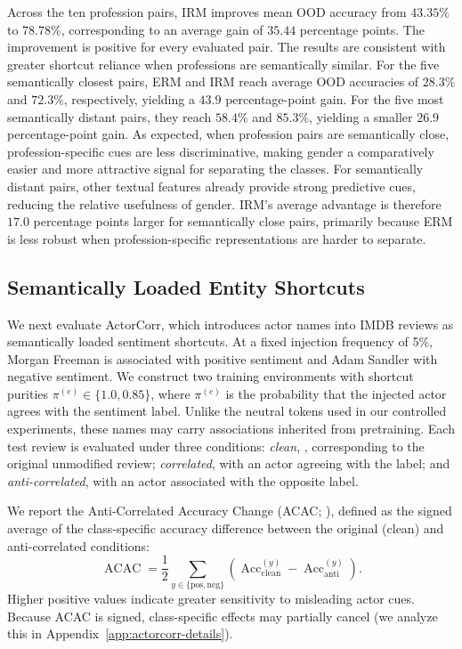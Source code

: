 \documentclass[11pt]{article}
\theoremstyle{definition}
\theoremstyle{plain}
\begin{document}
Across the ten profession pairs, IRM improves mean OOD accuracy from $43.35\%$ to $78.78\%$, corresponding to an average gain of $35.44$ percentage points. The improvement is positive for every evaluated pair. The results are consistent with greater shortcut reliance when professions are semantically similar. For the five semantically closest pairs, ERM and IRM reach average OOD accuracies of $28.3\%$ and $72.3\%$, respectively, yielding a $43.9$ percentage-point gain. For the five most semantically distant pairs, they reach $58.4\%$ and $85.3\%$, yielding a smaller $26.9$ percentage-point gain. As expected, when profession pairs are semantically close, profession-specific cues are less discriminative, making gender a comparatively easier and more attractive signal for separating the classes. For semantically distant pairs, other textual features already provide strong predictive cues, reducing the relative usefulness of gender. IRM's average advantage is therefore $17.0$ percentage points larger for semantically close pairs, primarily because ERM is less robust when profession-specific representations are harder to separate.


\subsection{Semantically Loaded Entity Shortcuts}
\label{sec:actorcorr}

We next evaluate ActorCorr, which introduces actor names into IMDB reviews as semantically loaded sentiment shortcuts. At a fixed injection frequency of 5\%, Morgan Freeman is associated with positive sentiment and Adam Sandler with negative sentiment. We construct two training environments with shortcut purities $\pi^{(e)}\in\{1.0,0.85\}$, where $\pi^{(e)}$ is the probability that the injected actor agrees with the sentiment label. Unlike the neutral tokens used in our controlled experiments, these names may carry associations inherited from pretraining. Each test review is evaluated under three conditions: \emph{clean}, , corresponding to the original unmodified review; \emph{correlated}, with an actor agreeing with the label; and \emph{anti-correlated}, with an actor associated with the opposite label.

We report the Anti-Correlated Accuracy Change (ACAC; \citet{eshuijs2025short}), defined as the signed
average of the class-specific accuracy difference between the original (clean) and anti-correlated conditions:
\begin{equation}
    \operatorname{ACAC} = \frac{1}{2} \sum_{y \in \{\mathrm{pos},\mathrm{neg}\}} \left( \operatorname{Acc}^{(y)}_{\mathrm{clean}} - \operatorname{Acc}^{(y)}_{\mathrm{anti}} \right).
\label{eq:actorcorr-acac}
\end{equation}
Higher positive values indicate greater sensitivity to misleading actor cues. Because ACAC is signed, class-specific effects may partially cancel (we analyze this in Appendix~\ref{app:actorcorr-details}).
\end{document}
